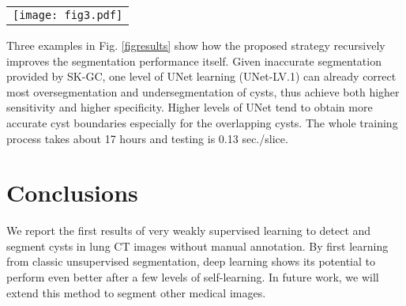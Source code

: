 \documentclass{article}
\begin{document}
   \begin{figure*}[!t]
   \begin{center}
   \begin{tabular}{c}
   \texttt{[image: fig3.pdf]}
   \end{tabular}
   \end{center}
   \caption[example]{ \label{figresults} 
Three examples (2 good image quality and 1 noisy) show segmentation results obtained by SK-GC, UNet-level1 and UNet-level2, given manual annotation as reference. UNet-level3 is not shown due to space constraint.
}
   \end{figure*} 

Three examples in Fig. \ref{figresults} show how the proposed strategy recursively improves the segmentation performance itself. Given inaccurate segmentation provided by SK-GC, one level of UNet learning (UNet-LV.1) can already correct most oversegmentation and undersegmentation of cysts, thus achieve both higher sensitivity and higher specificity. Higher levels of UNet tend to obtain more accurate cyst boundaries especially for the overlapping cysts. The whole training process takes about 17 hours and testing is 0.13 sec./slice.


\section{Conclusions}
We report the first results of very weakly supervised learning to detect and segment cysts in lung CT images without manual annotation. By first learning from classic unsupervised segmentation, deep learning shows its potential to perform even better after a few levels of self-learning. In future work, we will extend this method to segment other medical images. 





\end{document}
